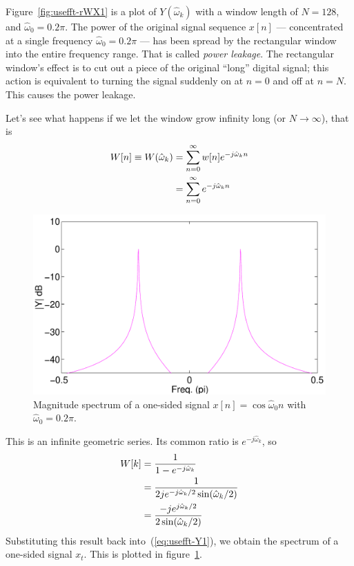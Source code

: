 Figure~\ref{fig:usefft-rWX1} is a plot of $Y(\hat{\omega}_k)$ with a
window length of $N=128$, and $\hat{\omega}_0=0.2\pi$. The power of
the original signal sequence $x[n]$ --- concentrated at a single
frequency $\hat{\omega}_0=0.2\pi$ --- has been spread by the
rectangular window into the entire frequency range. That is called
\emph{power leakage}. The rectangular window's effect is to cut out a
piece of the original ``long'' digital signal; this action is
equivalent to turning the signal suddenly on at $n=0$ and off at
$n=N$. This causes the power leakage.

Let's see what happens if we let the window grow infinity long (or $N
\rightarrow \infty$), that is
\begin{align}
W[n] \equiv W(\hat{\omega}_k)
  &= \sum_{n=0}^{\infty} w[n] e^{-j\hat{\omega}_k n} \notag\\
  &= \sum_{n=0}^{\infty} e^{-j\hat{\omega}_k n}
\end{align}

\begin{figure}
\centerline{\includegraphics[width=6in]{ch-fft/ufft_cos0-2_rWinfX}}
\caption{Magnitude spectrum of a one-sided signal
$x[n]=\cos\hat{\omega}_0 n$ with
$\hat{\omega}_0=0.2\pi$.\label{fig:usefft-rWinfX}}
\end{figure}

This is an infinite geometric series. Its common ratio is
$e^{-j\hat{\omega}_k}$, so
\begin{align}
W[k] &= \frac{1}{1-e^{-j\hat{\omega}_k}} \notag\\
  &= \frac{1}{2j e^{-j\hat{\omega}_k/2}\sin(\hat{\omega}_k/2)} \notag\\
  &= \frac{-je^{j\hat{\omega}_k/2}}{2\sin(\hat{\omega}_k/2)}
\label{eq:usefft-rWkinf}
\end{align}
Substituting this result back into~(\ref{eq:usefft-Y1}), we obtain the
spectrum of a one-sided signal $x_t$. This is plotted in
figure~\ref{fig:usefft-rWinfX}.

